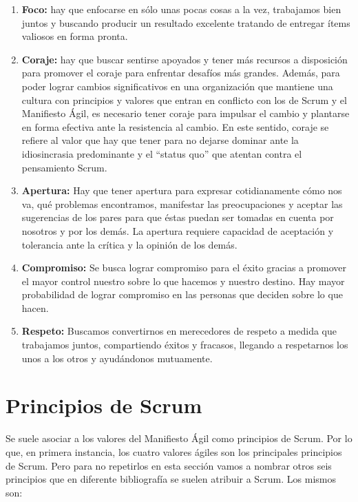 \begin{enumerate}
\item \textbf{Foco:} hay que enfocarse en sólo unas pocas cosas a la vez, trabajamos bien juntos y buscando producir un resultado excelente tratando de entregar ítems valiosos en forma pronta.

\item \textbf{Coraje:} hay que buscar sentirse apoyados y tener más recursos a disposición para promover el coraje para enfrentar desafíos más grandes. Además, para poder lograr cambios significativos en una organización que mantiene una cultura con principios y valores que entran en conflicto con los de Scrum y el Manifiesto Ágil, es necesario tener coraje para impulsar el cambio y plantarse en forma efectiva ante la resistencia al cambio. En este sentido, coraje se refiere al valor que hay que tener para no dejarse dominar ante la idiosincrasia predominante y el “status quo” que atentan contra el pensamiento Scrum.

\item \textbf{Apertura:} Hay que tener apertura para expresar cotidianamente cómo nos va, qué problemas encontramos, manifestar las preocupaciones y aceptar las sugerencias de los pares para que éstas puedan ser tomadas en cuenta por nosotros y por los demás. La apertura requiere capacidad de aceptación y tolerancia ante la crítica y la opinión de los demás.

\item \textbf{Compromiso:} Se busca lograr compromiso para el éxito gracias a promover el mayor control nuestro sobre lo que hacemos y nuestro destino. Hay mayor probabilidad de lograr compromiso en las personas que deciden sobre lo que hacen.

\item \textbf{Respeto:} Buscamos convertirnos en merecedores de respeto a medida que trabajamos juntos, compartiendo éxitos y fracasos, llegando a respetarnos los unos a los otros y ayudándonos mutuamente.
\end{enumerate}

\section{Principios de Scrum}

Se suele asociar a los valores del Manifiesto Ágil como principios de Scrum. Por lo que, en primera instancia, los cuatro valores ágiles son los principales principios de Scrum. Pero para no repetirlos en esta sección vamos a nombrar otros seis principios que en diferente bibliografía se suelen atribuir a Scrum. Los mismos son:

